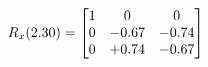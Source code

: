 \documentclass[preview]{standalone}
\begin{document}
\begin{align*}
\special{dvisvgm:raw <g id='unique000'>}R_{x}(2.30) = \begin{bmatrix}1 & 0 & 0 \\0 & -0.67 & -0.74 \\0 & +0.74 & -0.67\end{bmatrix}\special{dvisvgm:raw </g>}
\end{align*}
\end{document}
